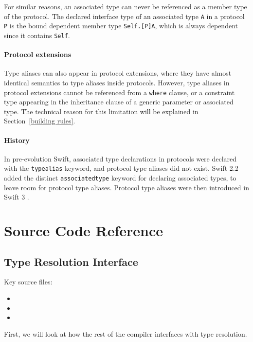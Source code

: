 \documentclass[../generics]{subfiles}
\begin{document}
For similar reasons, an associated type can never be referenced as a member type of the protocol. The declared interface type of an associated type \texttt{A} in a protocol \texttt{P} is the bound dependent member type \texttt{Self.[P]A}, which is always dependent since it contains \texttt{Self}.

\paragraph{Protocol extensions} Type aliases can also appear in protocol extensions, where they have almost identical semantics to type aliases inside protocols. However, type aliases in protocol extensions cannot be referenced from a \texttt{where} clause, or a constraint type appearing in the inheritance clause of a generic parameter or associated type. The technical reason for this limitation will be explained in Section~\ref{building rules}.

\paragraph{History} In pre-evolution Swift, associated type declarations in protocols were declared with the \texttt{typealias} keyword, and protocol type aliases did not exist. Swift 2.2 \cite{se0011} added the distinct \texttt{associatedtype} keyword for declaring associated types, to leave room for protocol type aliases. Protocol type aliases were then introduced in Swift 3 \cite{se0092}.

\section{Source Code Reference}\label{type resolution source ref}

\subsection*{Type Resolution Interface}

Key source files:
\begin{itemize}
\item {}
\item {}
\item {}
\end{itemize}
First, we will look at how the rest of the compiler interfaces with type resolution.
\end{document}
